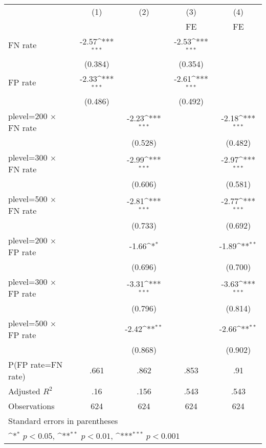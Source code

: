 {
\def\sym#1{\ifmmode^{#1}\else\(^{#1}\)\fi}
\begin{tabular}{l*{4}{c}}
\hline\hline
                &\multicolumn{1}{c}{(1)}&\multicolumn{1}{c}{(2)}&\multicolumn{1}{c}{(3)}&\multicolumn{1}{c}{(4)}\\
                &\multicolumn{1}{c}{}&\multicolumn{1}{c}{}&\multicolumn{1}{c}{FE}&\multicolumn{1}{c}{FE}\\
\hline
FN rate         &    -2.57\sym{***}&                  &    -2.53\sym{***}&                  \\
                &  (0.384)         &                  &  (0.354)         &                  \\
FP rate         &    -2.33\sym{***}&                  &    -2.61\sym{***}&                  \\
                &  (0.486)         &                  &  (0.492)         &                  \\
plevel=200 $\times$ FN rate&                  &    -2.23\sym{***}&                  &    -2.18\sym{***}\\
                &                  &  (0.528)         &                  &  (0.482)         \\
plevel=300 $\times$ FN rate&                  &    -2.99\sym{***}&                  &    -2.97\sym{***}\\
                &                  &  (0.606)         &                  &  (0.581)         \\
plevel=500 $\times$ FN rate&                  &    -2.81\sym{***}&                  &    -2.77\sym{***}\\
                &                  &  (0.733)         &                  &  (0.692)         \\
plevel=200 $\times$ FP rate&                  &    -1.66\sym{*}  &                  &    -1.89\sym{**} \\
                &                  &  (0.696)         &                  &  (0.700)         \\
plevel=300 $\times$ FP rate&                  &    -3.31\sym{***}&                  &    -3.63\sym{***}\\
                &                  &  (0.796)         &                  &  (0.814)         \\
plevel=500 $\times$ FP rate&                  &    -2.42\sym{**} &                  &    -2.66\sym{**} \\
                &                  &  (0.868)         &                  &  (0.902)         \\
\hline
P(FP rate=FN rate)&     .661         &     .862         &     .853         &      .91         \\
Adjusted \(R^{2}\)&      .16         &     .156         &     .543         &     .543         \\
Observations    &      624         &      624         &      624         &      624         \\
\hline\hline
\multicolumn{5}{l}{\footnotesize Standard errors in parentheses}\\
\multicolumn{5}{l}{\footnotesize \sym{*} \(p<0.05\), \sym{**} \(p<0.01\), \sym{***} \(p<0.001\)}\\
\end{tabular}
}
